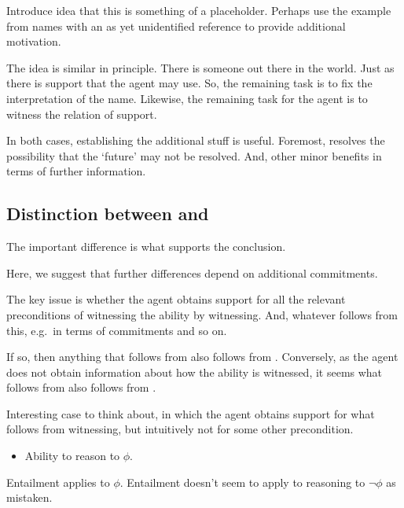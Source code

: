 \begin{note}
  Introduce idea that this is something of a placeholder.
  Perhaps use the example from names with an as yet unidentified reference to provide additional motivation.

  The idea is similar in principle.
  There is someone out there in the world.
  Just as there is support that the agent may use.
  So, the remaining task is to fix the interpretation of the name.
  Likewise, the remaining task for the agent is to witness the relation of support.

  In both cases, establishing the additional stuff is useful.
  Foremost, resolves the possibility that the `future' may not be resolved.
  And, other minor benefits in terms of further information.
\end{note}



\subsection{Distinction between \AR{} and \WR{}}
\label{sec:dist-betw-ar}

\begin{note}[Overview]
  The important difference is what supports the conclusion.

  Here, we suggest that further differences depend on additional commitments.
\end{note}


\begin{note}
  The key issue is whether the agent obtains support for all the relevant preconditions of witnessing the ability by witnessing.
  And, whatever follows from this, e.g.\ in terms of commitments and so on.

  If so, then anything that follows from \AR{} also follows from \WR{}.
  Conversely, as the agent does not obtain information about how the ability is witnessed, it seems what follows from \WR{} also follows from \AR{}.
\end{note}

\begin{note}
  Interesting case to think about, in which the agent obtains support for what follows from witnessing, but intuitively not for some other precondition.
  \begin{itemize}
  \item Ability to reason to \(\phi\).
  \end{itemize}
  Entailment applies to \(\phi\).
  Entailment doesn't seem to apply to reasoning to \(\lnot\phi\) as mistaken.
\end{note}

